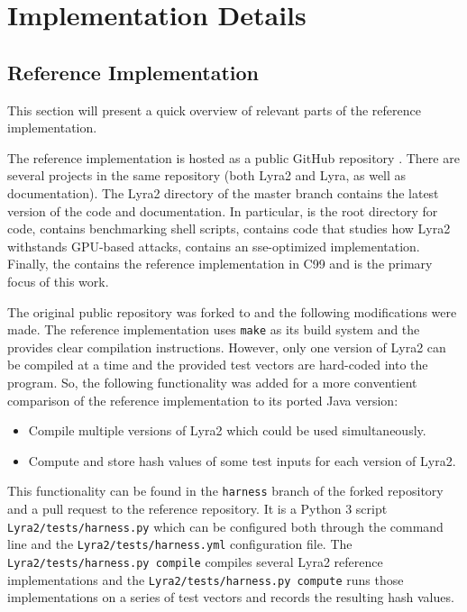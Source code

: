 \chapter{Implementation Details}
\label{sec:implementation-details}

\section{Reference Implementation}
\label{sec:reference-implementation}

This section will present a quick overview of relevant parts of the reference implementation.

The reference implementation is hosted as a public GitHub repository \cite{github:2017:lyra}. There are several projects in the same repository (both Lyra2 and Lyra, as well as documentation). The Lyra2 directory of the master branch contains the latest version of the code and documentation. In particular,  is the root directory for code,  contains benchmarking shell scripts,  contains code that studies how Lyra2 withstands GPU-based attacks,  contains an sse-optimized implementation. Finally, the  contains the reference implementation in C99 and is the primary focus of this work.

The original public repository \cite{github:2017:lyra} was forked to \cite{github:2017:lyra-copy} and the following modifications were made. The reference implementation uses \texttt{make} as its build system and the  provides clear compilation instructions. However, only one version of Lyra2 can be compiled at a time and the provided test vectors are hard-coded into the program. So, the following functionality was added for a more conventient comparison of the reference implementation to its ported Java version:

\begin{itemize}
    \item Compile multiple versions of Lyra2 which could be used simultaneously.
    \item Compute and store hash values of some test inputs for each version of Lyra2.
  \end{itemize}

This functionality can be found in the \texttt{harness} branch of the forked repository \cite{github:2017:lyra-copy} and a pull request \cite{github:2017:lyra-pr} to the reference repository. It is a Python 3 script \texttt{Lyra2/tests/harness.py} which can be configured both through the command line and the \texttt{Lyra2/tests/harness.yml} configuration file. The \texttt{Lyra2/tests/harness.py compile} compiles several Lyra2 reference implementations and the \texttt{Lyra2/tests/harness.py compute} runs those implementations on a series of test vectors and records the resulting hash values.


